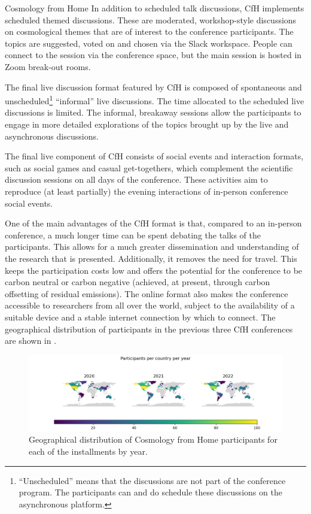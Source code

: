 \documentclass[../SustainableHEP.tex]{subfiles}
\begin{document}
\begin{casestudy}{Cosmology from Home}
In addition to scheduled talk discussions, CfH implements scheduled themed discussions. These are moderated, workshop-style discussions on cosmological themes that are of interest to the conference participants. The topics are suggested, voted on and chosen via the Slack workspace. People can connect to the session via the conference space, but the main session is hosted in Zoom break-out rooms.

The final live discussion format featured by CfH is composed of spontaneous and unscheduled\footnote{“Unscheduled” means that the discussions are not part of the conference program. The participants can and do schedule these discussions on the asynchronous platform.} “informal” live discussions. The time allocated to the scheduled live discussions is limited. The informal, breakaway sessions allow the participants to engage in more detailed explorations of the topics brought up by the live and asynchronous discussions.

The final live component of CfH consists of social events and interaction formats, such as social games and casual get-togethers, which complement the scientific discussion sessions on all days of the conference. These activities aim to reproduce (at least partially) the evening interactions of in-person conference social events.

One of the main advantages of the CfH format is that, compared to an in-person conference, a much longer time can be spent debating the talks of the participants. This allows for a much greater dissemination and understanding of the research that is presented. Additionally, it removes the need for travel. This keeps the participation costs low and offers the potential for the conference to be carbon neutral or carbon negative (achieved, at present, through carbon offsetting of residual emissions).  The online format also makes the conference accessible to researchers from all over the world, subject to the availability of a suitable device and a stable internet connection by which to connect. The geographical distribution of participants in the previous three CfH conferences are shown in .


\begin{figure}
    \centering
    \captionsetup{type=figure}
    \includegraphics[width=1.\textwidth]{Sections/Figs/Travel/map.png}
    \caption[Geographical distribution of CfH participants over time.]%
        {Geographical distribution of Cosmology from Home participants for each of the installments by year.\label{fig:CfH1}}
\end{figure}


\end{casestudy}
\end{document}
